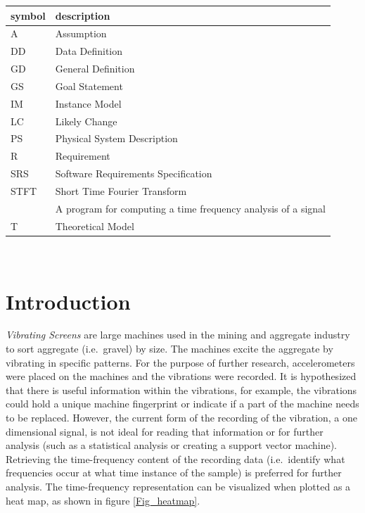 \documentclass[12pt]{article}
\begin{document}
\renewcommand{\arraystretch}{1.2}
\begin{tabular}{l l} 
  \toprule		
  \textbf{symbol} & \textbf{description}\\
  \midrule 
  A & Assumption\\
  DD & Data Definition\\
  GD & General Definition\\
  GS & Goal Statement\\
  IM & Instance Model\\
  LC & Likely Change\\
  PS & Physical System Description\\
  R & Requirement\\
  SRS & Software Requirements Specification\\
  STFT & Short Time Fourier Transform\\
  \progname{} & A program for computing a time frequency analysis of a signal\\
  T & Theoretical Model\\
  \bottomrule
\end{tabular}\\


\newpage


\section{Introduction}

\emph{Vibrating Screens} are large machines used in the mining and aggregate industry to sort aggregate (i.e.\ gravel) by size. The machines excite the aggregate by vibrating in specific patterns. For the purpose of further research, accelerometers were placed on the machines and the vibrations were recorded. It is hypothesized that there is useful information within the vibrations, for example, the vibrations could hold a unique machine fingerprint or indicate if a part of the machine needs to be replaced. However, the current form of the recording of the vibration, a one dimensional signal, is not ideal for reading that information or for further analysis (such as a statistical analysis or creating a support vector machine). Retrieving the 
time-frequency content of the recording data (i.e.\ identify what frequencies 
occur at what time instance of the sample) is preferred for further analysis. The time-frequency representation can be visualized when plotted as a heat map, as shown in figure \ref{Fig_heatmap}.
\end{document}
